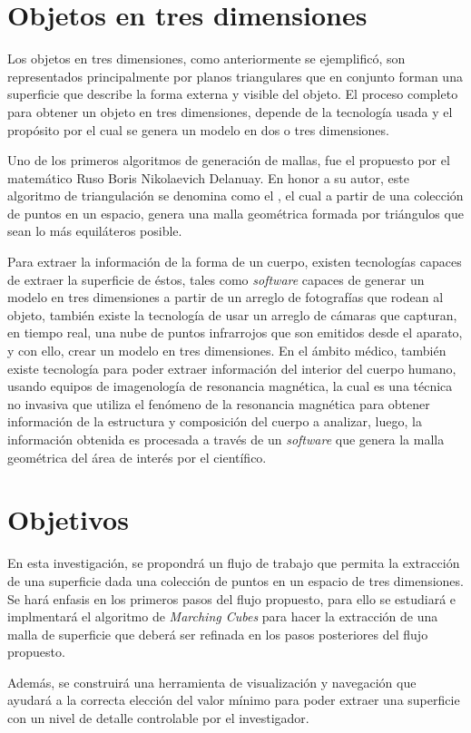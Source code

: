 \section{Objetos en tres dimensiones}
\label{sec:objectosEnTresDimensiones}
Los objetos en tres dimensiones, como anteriormente se ejemplificó, son representados
principalmente por planos triangulares que en conjunto forman una superficie que describe la
forma externa y visible del objeto. El proceso completo para obtener un objeto en tres dimensiones, depende de la tecnología usada y el propósito por el cual se genera un modelo en
dos o tres dimensiones.

Uno de los primeros algoritmos de generación de mallas, fue el propuesto por el
matemático Ruso Boris Nikolaevich Delanuay. En honor a su autor, este algoritmo de
triangulación se denomina como el , el cual a partir de
una colección de puntos en un espacio, genera una malla geométrica formada por triángulos que
sean lo más equiláteros posible.

Para extraer la información de la forma de un cuerpo, existen tecnologías capaces de
extraer la superficie de éstos, tales como \emph{software} capaces de generar un modelo en tres
dimensiones a partir de un arreglo de fotografías que rodean al objeto, también existe la
tecnología de usar un arreglo de cámaras que capturan, en tiempo real, una nube de puntos
infrarrojos que son emitidos desde el aparato, y con ello, crear un modelo en tres dimensiones. En
el ámbito médico, también existe tecnología para poder extraer información del interior del
cuerpo humano, usando equipos de imagenología de resonancia magnética, la cual es una técnica
no invasiva que utiliza el fenómeno de la resonancia magnética para obtener información de la
estructura y composición del cuerpo a analizar, luego, la información obtenida es procesada a
través de un \emph{software} que genera la malla geométrica del área de interés por el científico.

\section{Objetivos}
\label{sec:objetivos}
En esta investigación, se propondrá un flujo de trabajo que permita la extracción de una superficie dada una colección de puntos en un espacio de tres dimensiones. Se hará enfasis en los primeros pasos del flujo propuesto, para ello se estudiará e implmentará el algoritmo de \emph{Marching Cubes} para hacer la extracción de una malla de superficie que deberá ser refinada en los pasos posteriores del flujo propuesto.

Además, se construirá una herramienta de visualización y navegación que ayudará a la correcta elección del valor mínimo para poder extraer una superficie con un nivel de detalle controlable por el investigador.